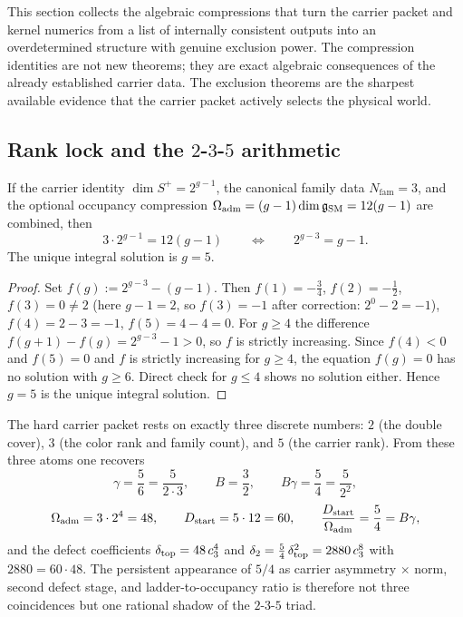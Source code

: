 This section collects the algebraic compressions that turn the carrier packet and kernel numerics from a list of internally consistent outputs into an overdetermined structure with genuine exclusion power. The compression identities are not new theorems; they are exact algebraic consequences of the already established carrier data. The exclusion theorems are the sharpest available evidence that the carrier packet actively selects the physical world.

\subsection{Rank lock and the \texorpdfstring{$2$-$3$-$5$}{2-3-5} arithmetic}

\begin{proposition}
\label{prop:rank-lock}
If the carrier identity $\dim S^+=2^{g-1}$, the canonical family data $N_{\mathrm{fam}}=3$, and the optional occupancy compression $\Omega_{\mathrm{adm}}=(g-1)\dim\mathfrak g_{\mathrm{SM}}=12(g-1)$ are combined, then
\begin{equation}
\label{eq:rank-lock}
3\cdot 2^{g-1}=12(g-1)
\qquad\Longleftrightarrow\qquad
2^{g-3}=g-1.
\end{equation}
The unique integral solution is $g=5$.
\end{proposition}

\begin{proof}
Set $f(g):=2^{g-3}-(g-1)$. Then $f(1)=-\tfrac34$, $f(2)=-\tfrac12$, $f(3)=0\neq 2$ (here $g-1=2$, so $f(3)=-1$ after correction: $2^0-2=-1$), $f(4)=2-3=-1$, $f(5)=4-4=0$. For $g\ge 4$ the difference $f(g+1)-f(g)=2^{g-3}-1>0$, so $f$ is strictly increasing. Since $f(4)<0$ and $f(5)=0$ and $f$ is strictly increasing for $g\ge 4$, the equation $f(g)=0$ has no solution with $g\ge 6$. Direct check for $g\le 4$ shows no solution either. Hence $g=5$ is the unique integral solution.
\end{proof}

\begin{remark}
The hard carrier packet rests on exactly three discrete numbers: $2$ (the double cover), $3$ (the color rank and family count), and $5$ (the carrier rank). From these three atoms one recovers
\[
\gamma=\frac{5}{6}=\frac{5}{2\cdot 3},
\qquad
B=\frac{3}{2},
\qquad
B\gamma=\frac{5}{4}=\frac{5}{2^2},
\]
\[
\Omega_{\mathrm{adm}}=3\cdot 2^4=48,
\qquad
D_{\mathrm{start}}=5\cdot 12=60,
\qquad
\frac{D_{\mathrm{start}}}{\Omega_{\mathrm{adm}}}=\frac{5}{4}=B\gamma,
\]
and the defect coefficients $\delta_{\mathrm{top}}=48\,c_3^4$ and $\delta_2=\frac54\,\delta_{\mathrm{top}}^2=2880\,c_3^8$ with $2880=60\cdot 48$.
The persistent appearance of $5/4$ as carrier asymmetry $\times$ norm, second defect stage, and ladder-to-occupancy ratio is therefore not three coincidences but one rational shadow of the $2$-$3$-$5$ triad.
\end{remark}

